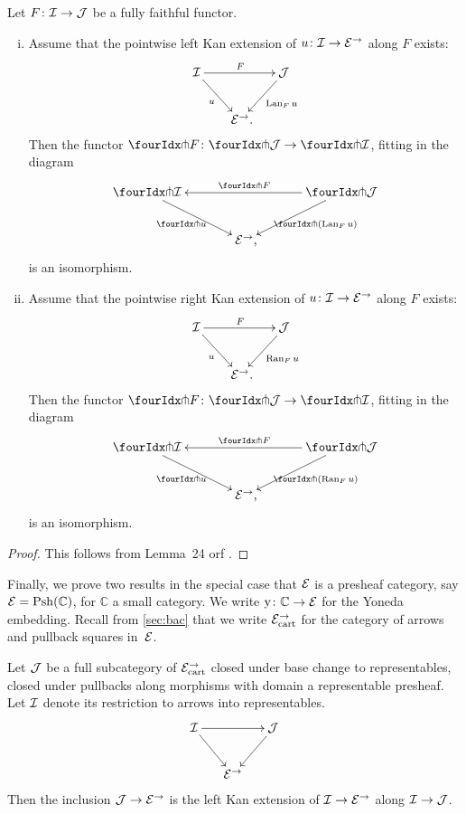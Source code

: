 \documentclass[reqno,10pt,a4paper,oneside,draft]{amsart}
\begin{document}
{{\begin{proposition} \label{kan-extension-closure}
Let $F \co \cal{I} \to \cal{J}$ be a fully faithful functor.
\begin{enumerate}[(i)]
\item Assume that the pointwise left Kan extension of $u \co \cal{I} \to \catE^\to$ along $F$ exists:
\[
\xymatrix@!C@C-1em{
  \cal{I}
  \ar[dr]_{u}
  \ar[rr]^{F}
&&
  \cal{J}
  \ar[dl]^{\Lan_F u}
\\&
  \catE^\to
\rlap{.}}
\]
Then the functor $\liftr{F} \co \liftr{\cal{J}} \to \liftr{\cal{I}}$, fitting in the diagram
\[
\xymatrix@!C@C-1em{
  \liftr{\cal{I}}
  \ar[dr]_{\liftr{u}}
&&
  \liftr{\cal{J}}
  \ar[ll]_{\liftr{F}}
  \ar[dl]^{\liftr{(\Lan_F u)}}
\\&
  \catE^\to
\rlap{,}}
\]
is an isomorphism.
\item Assume that the pointwise right Kan extension of $u \co \cal{I} \to \catE^\to$ along $F$ exists:
\[
\xymatrix@!C@C-1em{
  \cal{I}
  \ar[dr]_{u}
  \ar[rr]^{F}
&&
  \cal{J}
  \ar[dl]^{\Ran_F u}
\\&
  \catE^\to
\rlap{.}}
\]
Then the functor $\liftl{F} \co \liftl{\cal{J}} \to \liftl{\cal{I}}$, fitting in the diagram
\[
\xymatrix@!C@C-1em{
  \liftl{\cal{I}}
  \ar[dr]_{\liftl{u}}
&&
  \liftl{\cal{J}}
  \ar[ll]_{\liftl{F}}
  \ar[dl]^{\liftl{(\Ran_F u)}}
\\&
  \catE^\to
\rlap{,}}
\]
is an isomorphism.
\end{enumerate}
\end{proposition}

\begin{proof}
This follows from Lemma~24 orf \cite{bourke-garner-I}.
\end{proof}

Finally, we prove two results in the special case that $\catE$ is a presheaf category, say $\cal{E} = \Psh(\mathbb{C})$, for $\mathbb{C}$ a small category.
We write $\yon \co \mathbb{C} \to \cal{E}$ for the Yoneda embedding.
Recall from \cref{sec:bac} that we write $\catE_{\cart}^\to$ for the category of arrows and pullback squares in~$\cal{E}$.

\begin{lemma} \label{left-kan-extension-of-representables}
Let $\cal{J}$ be a full subcategory of $\catE_{\cart}^\to$ closed under base change to representables, \ie closed under pullbacks along morphisms with domain a representable presheaf.
Let $\cal{I}$ denote its restriction to arrows into representables.
\[
\xymatrix@C-1em{
  \cal{I}
  \ar[rr]
  \ar[dr]
&&
  \cal{J}
  \ar[dl]
\\&
  \catE^\to
}
\]
Then the inclusion $\cal{J} \to \catE^\to$ is the left Kan extension of $\cal{I} \to \catE^\to$ along $\cal{I} \to \cal{J}$.
\end{lemma}

}}
\end{document}
